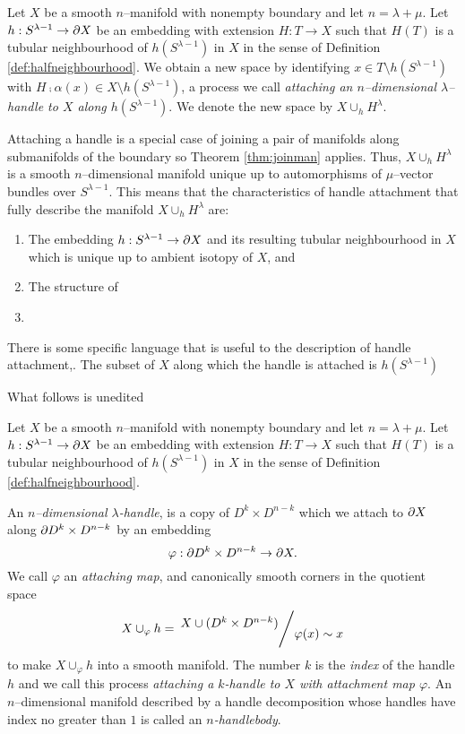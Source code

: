 \begin{defn}[Handle]
	Let $X$ be a smooth $n$--manifold with nonempty boundary and let $n=\lambda+\mu$.
	Let $h:S^{\lambda-1}\to \partial X$ be an embedding with extension $H:T\to X$ such that $H(T)$ is a tubular neighbourhood of $h(S^{\lambda-1})$ in $X$ in the sense of Definition \ref{def:halfneighbourhood}.
	We obtain a new space by identifying $x\in T\setminus h(S^{\lambda-1})$ with $H\comp\alpha(x)\in X\setminus h(S^{\lambda-1})$, a process we call \emph{attaching an $n$--dimensional $\lambda$--handle to $X$ along $h(S^{\lambda-1})$}.
	We denote the new space by $X\cup_h H^\lambda$.	
\end{defn}

Attaching a handle is a special case of joining a pair of manifolds along submanifolds of the boundary so Theorem \ref{thm:joinman} applies.
Thus, $X\cup_h H^\lambda$ is a smooth $n$--dimensional manifold unique up to automorphisms of $\mu$--vector bundles over $S^{\lambda-1}$.
This means that the characteristics of handle attachment that fully describe the manifold $X\cup_h H^\lambda$ are:
\begin{enumerate}
	\item The embedding $h:S^{\lambda-1}\to\partial X$ and its resulting tubular neighbourhood in $X$ which is unique up to ambient isotopy of $X$, and
	\item The structure of
	\item
	
\end{enumerate}

There is some specific language that is useful to the description of handle attachment,.
The subset of $X$ along which the handle is attached is $h(S^{\lambda-1})$


\newpage

\begin{center}
	What follows is unedited
\end{center}

\newpage

\begin{defn}[Handle]
	\label{def:handle}	
	Let $X$ be a smooth $n$--manifold with nonempty boundary and let $n=\lambda+\mu$.
	Let $h:S^{\lambda-1}\to \partial X$ be an embedding with extension $H:T\to X$ such that $H(T)$ is a tubular neighbourhood of $h(S^{\lambda-1})$ in $X$ in the sense of Definition \ref{def:halfneighbourhood}.
	
	An \emph{$n$--dimensional $\lambda$-handle}, is a copy of $D^k\times D^{n-k}$ which we attach to $\partial X$ along $\partial D^k\times D^{n-k}$ by an embedding
	\[
	\varphi : \partial D^k \times D^{n-k} \to \partial X.
	\]
	We call $\varphi$ an \emph{attaching map}, and canonically smooth corners \cite{GompStip} in the quotient space
	\[
	X\cup_\varphi h = \quotient{X \cup ( D^k\times D^{n-k} ) }{ \varphi(x) \sim x }
	\]
	to make $X\cup_\varphi h$ into a smooth manifold.
	The number $k$ is the \emph{index} of the handle $h$ and we call this process \emph{attaching a $k$-handle to $X$ with attachment map $\varphi$}.
	An $n$--dimensional manifold described by a handle decomposition whose handles have index no greater than $1$ is called an \emph{$n$-handlebody}.
\end{defn}




